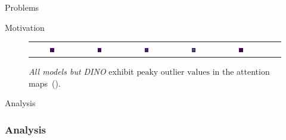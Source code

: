\documentclass[aspectratio=169]{beamer}
\begin{document}
\begin{section}{Problems}
\begin{subsection}{Motivation}
\begin{frame}
\begin{figure}[h]
{\begin{tabular}{c cc cc cc }
      \includegraphics[width=0.10\textwidth]{resources/230914_1202_fig2_vizs_various_models/deit3_large_patch16_224.fb_in22k_ft_in1k_1753_lastattmap.png} &
      \includegraphics[width=0.10\textwidth]{resources/230914_1202_fig2_vizs_various_models/vit_base_patch16_clip_224.laion2b_1753_lastattmap.png} &
      \includegraphics[width=0.10\textwidth]{resources/230914_1202_fig2_vizs_various_models/vit_large_patch14_clip_224.laion2b_1753_lastattmap.png} &
      \includegraphics[width=0.10\textwidth]{resources/230914_1202_fig2_vizs_various_models/vit_base_patch16_224.dino_1753_lastattmap.png} &
      \includegraphics[width=0.10\textwidth]{resources/230914_1202_fig2_vizs_various_models/vit_giant_patch14_dinov2.lvd142m_1753_lastattmap.png}
      \\
    \end{tabular}
    }
    \vspace{-0.6em}
    \caption{
      \emph{All models but DINO} exhibit $\boxed{\text{peaky outlier values}}$ in the attention maps~(\cite{darcetVisionTransformersNeed2024}).
    }  
    \label{fig:allvits}
\end{figure}
\end{frame}

\end{subsection}

\begin{subsection}{Analysis}

\begin{frame}
\frametitle{Analysis}


\end{frame}
\end{subsection}
\end{section}
\end{document}
